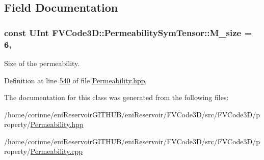 \subsection{Field Documentation}
\subsubsection[{\texorpdfstring{M\+\_\+size}{M_size}}]{\setlength{\rightskip}{0pt plus 5cm}const {\bf U\+Int} F\+V\+Code3\+D\+::\+Permeability\+Sym\+Tensor\+::\+M\+\_\+size = 6\hspace{0.3cm}{\ttfamily [static]}, {\ttfamily [private]}}\hypertarget{classFVCode3D_1_1PermeabilitySymTensor_a611205289ba216ec4505dd76a284dd9b}{}\label{classFVCode3D_1_1PermeabilitySymTensor_a611205289ba216ec4505dd76a284dd9b}


Size of the permeability. 



Definition at line \hyperlink{Permeability_8hpp_source_l00540}{540} of file \hyperlink{Permeability_8hpp_source}{Permeability.\+hpp}.



The documentation for this class was generated from the following files\+:\begin{DoxyCompactItemize}
\item 
/home/corinne/eni\+Reservoir\+G\+I\+T\+H\+U\+B/eni\+Reservoir/\+F\+V\+Code3\+D/src/\+F\+V\+Code3\+D/property/\hyperlink{Permeability_8hpp}{Permeability.\+hpp}\item 
/home/corinne/eni\+Reservoir\+G\+I\+T\+H\+U\+B/eni\+Reservoir/\+F\+V\+Code3\+D/src/\+F\+V\+Code3\+D/property/\hyperlink{Permeability_8cpp}{Permeability.\+cpp}\end{DoxyCompactItemize}
